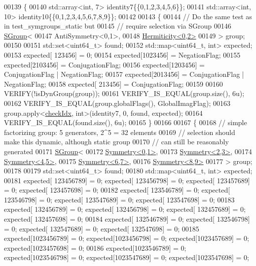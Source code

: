 \begin{DoxyCode}
00139 \{
00140   std::array<int, 7> identity7\{\{0,1,2,3,4,5,6\}\};
00141   std::array<int, 10> identity10\{\{0,1,2,3,4,5,6,7,8,9\}\};
00142 
00143   \{
00144     \textcolor{comment}{// Do the same test as in test\_symgroups\_static but}
00145     \textcolor{comment}{// require selection via SGroup}
00146     \hyperlink{class_eigen_1_1_s_group}{SGroup}<
00147       AntiSymmetry<0,1>,
00148       \hyperlink{struct_eigen_1_1_hermiticity}{Hermiticity<0,2>}
00149     > group;
00150 
00151     std::set<uint64\_t> found;
00152     std::map<uint64\_t, int> expected;
00153     expected[ 123456] = 0;
00154     expected[1023456] = NegationFlag;
00155     expected[2103456] = ConjugationFlag;
00156     expected[1203456] = ConjugationFlag | NegationFlag;
00157     expected[2013456] = ConjugationFlag | NegationFlag;
00158     expected[ 213456] = ConjugationFlag;
00159 
00160     VERIFY(!isDynGroup(group));
00161     VERIFY\_IS\_EQUAL(group.size(), 6u);
00162     VERIFY\_IS\_EQUAL(group.globalFlags(), GlobalImagFlag);
00163     group.apply<\hyperlink{structcheck_idx}{checkIdx}, \textcolor{keywordtype}{int}>(identity7, 0, found, expected);
00164     VERIFY\_IS\_EQUAL(found.size(), 6u);
00165   \}
00166 
00167   \{
00168     \textcolor{comment}{// simple factorizing group: 5 generators, 2^5 = 32 elements}
00169     \textcolor{comment}{// selection should make this dynamic, although static group}
00170     \textcolor{comment}{// can still be reasonably generated}
00171     \hyperlink{class_eigen_1_1_s_group}{SGroup}<
00172       \hyperlink{struct_eigen_1_1_symmetry}{Symmetry<0,1>},
00173       \hyperlink{struct_eigen_1_1_symmetry}{Symmetry<2,3>},
00174       \hyperlink{struct_eigen_1_1_symmetry}{Symmetry<4,5>},
00175       \hyperlink{struct_eigen_1_1_symmetry}{Symmetry<6,7>},
00176       \hyperlink{struct_eigen_1_1_symmetry}{Symmetry<8,9>}
00177     > group;
00178 
00179     std::set<uint64\_t> found;
00180     std::map<uint64\_t, int> expected;
00181     expected[ 123456789] = 0; expected[ 123456798] = 0; expected[ 123457689] = 0; expected[ 123457698] = 0;
00182     expected[ 123546789] = 0; expected[ 123546798] = 0; expected[ 123547689] = 0; expected[ 123547698] = 0;
00183     expected[ 132456789] = 0; expected[ 132456798] = 0; expected[ 132457689] = 0; expected[ 132457698] = 0;
00184     expected[ 132546789] = 0; expected[ 132546798] = 0; expected[ 132547689] = 0; expected[ 132547698] = 0;
00185     expected[1023456789] = 0; expected[1023456798] = 0; expected[1023457689] = 0; expected[1023457698] = 0;
00186     expected[1023546789] = 0; expected[1023546798] = 0; expected[1023547689] = 0; expected[1023547698] = 0;

\end{DoxyCode}
